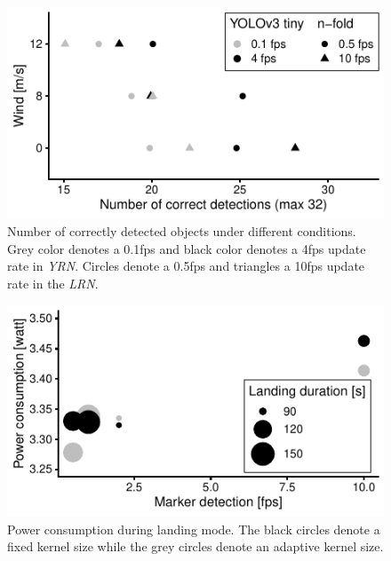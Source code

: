 \documentclass[conference]{IEEEtran}
\begin{document}
\begin{figure}[t]
  \centering
  \includegraphics{data_visualization/QoSDetection.pdf}
  \caption{Number of correctly detected objects
  under different conditions. 
  Grey color denotes a 0.1fps and black color denotes a 4fps 
  update rate in \emph{YRN}. 
  Circles denote a 0.5fps and triangles a 10fps update 
  rate in the \emph{LRN}.}
  \label{fig:NCorrectObjectDetections}
\end{figure}

\begin{figure}[t]
\centering
\includegraphics{data_visualization/PowerLanding.pdf}
\caption{Power consumption during landing mode. 
The black circles denote a fixed kernel size while the grey circles denote an adaptive kernel size.}
\label{fig:PowerDuringLanding}
\end{figure}
\end{document}

